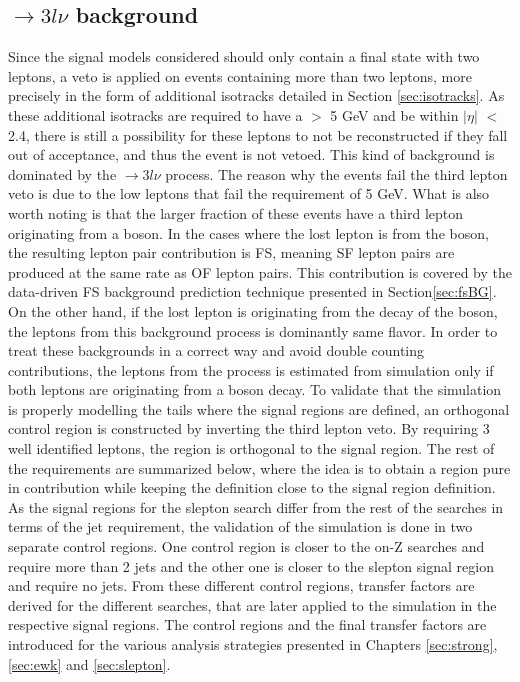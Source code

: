 \subsection*{\PWZ$\rightarrow3l\nu$ background}
\noindent
\justify
Since the signal models considered should only contain a final state with two leptons, a veto is applied on events containing more than two leptons, more precisely in the form of additional isotracks
 detailed in Section \ref{sec:isotracks}. 
As these additional isotracks are required to have a \pt $>$ 5 GeV and be within $|\eta|$ $<$ 2.4, there is still a possibility for these leptons to not be reconstructed if they fall out of acceptance, and thus the event is not vetoed. 
This kind of background is dominated by the \PWZ$\rightarrow3l\nu$ process.
The reason why the events fail the third lepton veto is due to the low \pt leptons that fail the \pt requirement of 5 GeV. 
What is also worth noting is that the larger fraction of these events have a third lepton originating from a \PZ boson. 
In the cases where the lost lepton is from the \PZ boson, the resulting lepton pair contribution is FS, meaning SF lepton pairs are produced at the same rate as OF lepton pairs. 
This contribution is covered by the data-driven FS background prediction technique presented in Section\ref{sec:fsBG}.
On the other hand, if the lost lepton is originating from the decay of the \PW boson, the leptons from this background process is dominantly same flavor. 
In order to treat these backgrounds in a correct way and avoid double counting contributions, the leptons from the \PWZ process is estimated from simulation only if both leptons are originating from a \PZ boson decay. 
To validate that the simulation is properly modelling the \ptmiss tails where the signal regions are defined, an orthogonal control region is constructed by inverting the third lepton veto. 
By requiring 3 well identified leptons, the region is orthogonal to the signal region. 
The rest of the requirements are summarized below, where the idea is to obtain a region pure in \PWZ contribution while keeping the definition close to the signal region definition. 
As the signal regions for the slepton search differ from the rest of the searches in terms of the jet requirement, the validation of the \PWZ simulation is done in two separate control regions. 
One control region is closer to the on-Z searches and require more than 2 jets and the other one is closer to the slepton signal region and require no jets. 
From these different control regions, transfer factors are derived for the different searches, that are later applied to the simulation in the respective signal regions. 
The control regions and the final transfer factors are introduced for the various analysis strategies presented in Chapters \ref{sec:strong}, \ref{sec:ewk} and \ref{sec:slepton}. 
